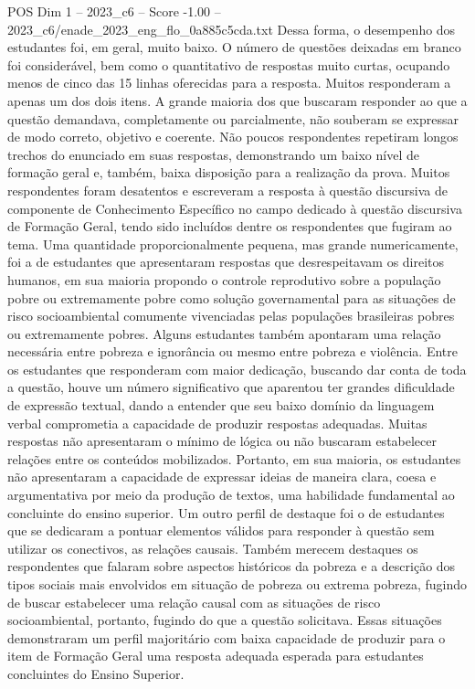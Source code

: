 \begin{textsample}{POS Dim 1 – 2023\_c6 – Score -1.00 – 2023\_c6/enade\_2023\_eng\_flo\_0a885c5cda.txt}
Dessa forma, o desempenho dos estudantes foi, em geral, muito baixo.
O número de questões deixadas em branco foi considerável, bem como o quantitativo de respostas muito curtas, ocupando menos de cinco das 15 linhas oferecidas para a resposta.
Muitos responderam a apenas um dos dois itens.
A grande maioria dos que buscaram responder ao que a questão demandava, completamente ou parcialmente, não souberam se expressar de modo correto, objetivo e coerente.
Não poucos respondentes repetiram longos trechos do enunciado em suas respostas, demonstrando um baixo nível de formação geral e, também, baixa disposição para a realização da prova.
Muitos respondentes foram desatentos e escreveram a resposta à questão discursiva de componente de Conhecimento Específico no campo dedicado à questão discursiva de Formação Geral, tendo sido incluídos dentre os respondentes que fugiram ao tema.
Uma quantidade proporcionalmente pequena, mas grande numericamente, foi a de estudantes que apresentaram respostas que desrespeitavam os direitos humanos, em sua maioria propondo o controle reprodutivo sobre a população pobre ou extremamente pobre como solução governamental para as situações de risco socioambiental comumente vivenciadas pelas populações brasileiras pobres ou extremamente pobres.
Alguns estudantes também apontaram uma relação necessária entre pobreza e ignorância ou mesmo entre pobreza e violência.
Entre os estudantes que responderam com maior dedicação, buscando dar conta de toda a questão, houve um número significativo que aparentou ter grandes dificuldade de expressão textual, dando a entender que seu baixo domínio da linguagem verbal comprometia a capacidade de produzir respostas adequadas.
Muitas respostas não apresentaram o mínimo de lógica ou não buscaram estabelecer relações entre os conteúdos mobilizados.
Portanto, em sua maioria, os estudantes não apresentaram a capacidade de expressar ideias de maneira clara, coesa e argumentativa por meio da produção de textos, uma habilidade fundamental ao concluinte do ensino superior.
Um outro perfil de destaque foi o de estudantes que se dedicaram a pontuar elementos válidos para responder à questão sem utilizar os conectivos, as relações causais.
Também merecem destaques os respondentes que falaram sobre aspectos históricos da pobreza e a descrição dos tipos sociais mais envolvidos em situação de pobreza ou extrema pobreza, fugindo de buscar estabelecer uma relação causal com as situações de risco socioambiental, portanto, fugindo do que a questão solicitava.
Essas situações demonstraram um perfil majoritário com baixa capacidade de produzir para o item de Formação Geral uma resposta adequada esperada para estudantes concluintes do Ensino Superior.

\end{textsample}
